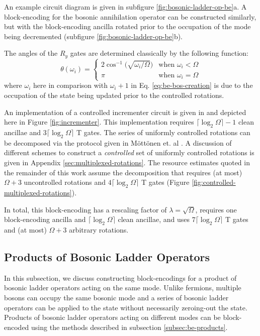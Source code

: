 An example circuit diagram is given in subfigure \ref{fig:bosonic-ladder-op-be}a.
A block-encoding for the bosonic annihilation operator can be constructed similarly, but with the block-encoding ancilla rotated prior to the occupation of the mode being decremented (subfigure \ref{fig:bosonic-ladder-op-be}b).

The angles of the $R_y$ gates are determined classically by the following function:
\begin{equation}
    \label{eq:single-op-angles}
    \theta(\omega_i) = 
    \begin{cases} 
        2 \cos^{-1}\Big(\sqrt{\omega_i/\Omega}\Big) & \text{when } \omega_i < \Omega\\
        \pi & \text{when } \omega_i = \Omega
    \end{cases}
\end{equation}
where $\omega_i$ here in comparison with $\omega_i + 1$ in Eq. \ref{eq:be-bos-creation} is due to the occupation of the state being updated prior to the controlled rotations.


An implementation of a controlled incrementer circuit is given in \cite{Gidney_2015} and depicted here in Figure \ref{fig:incrementer}.
This implementation requires $\lceil \log_2\Omega \rceil - 1$ clean ancillae and $3 \lceil \log_2\Omega \rceil$ T gates.
The series of uniformly controlled rotations can be decomposed via the protocol given in Möttönen et. al \cite{mottonen2004transformation}.
A discussion of different schemes to construct a \textit{controlled} set of uniformly controlled rotations is given in Appendix \ref{sec:multiplexed-rotations}.
The resource estimates quoted in the remainder of this work assume the decomposition that requires (at most) $\Omega + 3$ uncontrolled rotations and $4 \lceil{\log_2{\Omega}}\rceil$ T gates (Figure \ref{fig:controlled-multiplexed-rotations}).

In total, this block-encoding has a rescaling factor of $\lambda = \sqrt{\Omega}$, requires one block-encoding ancilla and $\lceil{\log_2{\Omega}}\rceil$ clean ancillae, and uses $7 \lceil \log_2\Omega \rceil$ T gates and (at most) $\Omega + 3$ arbitrary rotations.


\subsection{Products of Bosonic Ladder Operators}

In this subsection, we discuss constructing block-encodings for a product of bosonic ladder operators acting on the same mode.
Unlike fermions, multiple bosons can occupy the same bosonic mode and a series of bosonic ladder operators can be applied to the state without necessarily zeroing-out the state.
Products of bosonic ladder operators acting on different modes can be block-encoded using the methods described in subsection \ref{subsec:be-products}.


